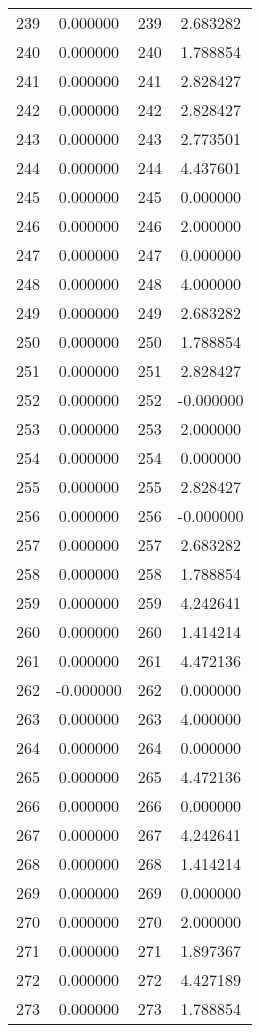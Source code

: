 \documentclass[12pt]{article}
\begin{document}
\begin{longtable}{@{}cccc@{}}
239 & 0.000000 & 239 & 2.683282 \\
240 & 0.000000 & 240 & 1.788854 \\
241 & 0.000000 & 241 & 2.828427 \\
242 & 0.000000 & 242 & 2.828427 \\
243 & 0.000000 & 243 & 2.773501 \\
244 & 0.000000 & 244 & 4.437601 \\
245 & 0.000000 & 245 & 0.000000 \\
246 & 0.000000 & 246 & 2.000000 \\
247 & 0.000000 & 247 & 0.000000 \\
248 & 0.000000 & 248 & 4.000000 \\
249 & 0.000000 & 249 & 2.683282 \\
250 & 0.000000 & 250 & 1.788854 \\
251 & 0.000000 & 251 & 2.828427 \\
252 & 0.000000 & 252 & -0.000000 \\
253 & 0.000000 & 253 & 2.000000 \\
254 & 0.000000 & 254 & 0.000000 \\
255 & 0.000000 & 255 & 2.828427 \\
256 & 0.000000 & 256 & -0.000000 \\
257 & 0.000000 & 257 & 2.683282 \\
258 & 0.000000 & 258 & 1.788854 \\
259 & 0.000000 & 259 & 4.242641 \\
260 & 0.000000 & 260 & 1.414214 \\
261 & 0.000000 & 261 & 4.472136 \\
262 & -0.000000 & 262 & 0.000000 \\
263 & 0.000000 & 263 & 4.000000 \\
264 & 0.000000 & 264 & 0.000000 \\
265 & 0.000000 & 265 & 4.472136 \\
266 & 0.000000 & 266 & 0.000000 \\
267 & 0.000000 & 267 & 4.242641 \\
268 & 0.000000 & 268 & 1.414214 \\
269 & 0.000000 & 269 & 0.000000 \\
270 & 0.000000 & 270 & 2.000000 \\
271 & 0.000000 & 271 & 1.897367 \\
272 & 0.000000 & 272 & 4.427189 \\
273 & 0.000000 & 273 & 1.788854 \\

\end{longtable}
\end{document}
